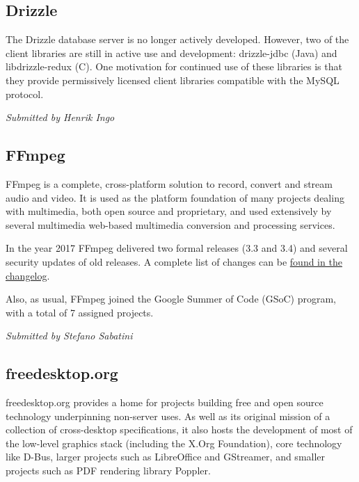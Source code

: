 \documentclass[a4paper]{report}
\begin{document}
\subsection{Drizzle}

The Drizzle database server is no longer actively developed. However,
two of the client libraries are still in active use and development:
drizzle-jdbc (Java) and libdrizzle-redux (C). One motivation for
continued use of these libraries is that they provide permissively
licensed client libraries compatible with the MySQL protocol.

{\em Submitted by Henrik Ingo}

\subsection{FFmpeg}

FFmpeg is a complete, cross-platform solution to record, convert and
stream audio and video. It is used as the platform foundation of many
projects dealing with multimedia, both open source and proprietary, and
used extensively by several multimedia web-based multimedia conversion
and processing services.

In the year 2017 FFmpeg delivered two formal releases (3.3 and 3.4) and
several security updates of old releases. A complete list of changes can
be \href{http://git.videolan.org/?p=ffmpeg.git;a=blob_plain;f=Changelog;hb=HEAD}{found
in the changelog}.

Also, as usual, FFmpeg joined the Google Summer of Code (GSoC) program,
with a total of 7 assigned projects.

{\em Submitted by Stefano Sabatini}

\subsection{freedesktop.org}

freedesktop.org provides a home for projects building free and
open source technology underpinning non-server uses. As well as its
original mission of a collection of cross-desktop specifications, it
also hosts the development of most of the low-level graphics stack
(including the X.Org Foundation), core technology like D-Bus, larger
projects such as LibreOffice and GStreamer, and smaller projects such as
PDF rendering library Poppler.
\end{document}

